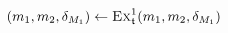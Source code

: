 \begin{algorithmic}[1]
        \algindentskip
            \State \Return{$\bot$}
        \EndIf
        \algblockskip

            \State $(\model{m}{1}, \model{m}{2}, \change{\metamodel{M}{1}}) \gets \function{Ex}_\transformation{t}^1(\model{m}{1}, \model{m}{2}, \change{\metamodel{M}{1}})$
                \State \Return{$\bot$} \label{algo:synchronization:execute_bidirectional_transformation:line:returnbot}
            \EndIf
        \EndWhile
        \algblockskip

        \State {} \label{algo:synchronization:execute_bidirectional_transformation:line:returnresult}
        \algindentskip
    \EndProcedure
\end{algorithmic}